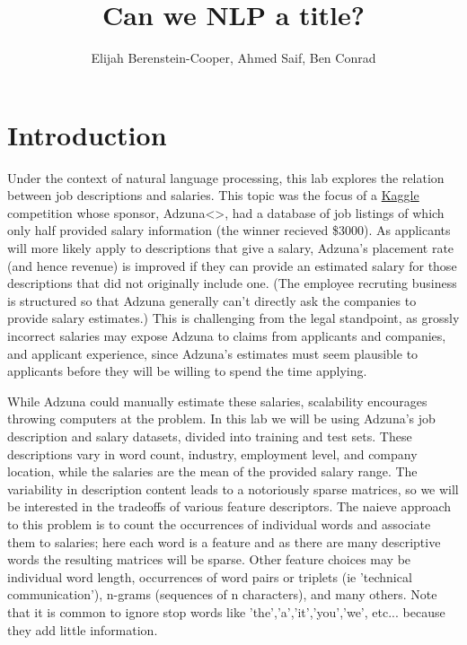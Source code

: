 \documentclass[12pt]{article}
\begin{document}
\title{Can we NLP a title?}

\author{
Elijah Berenstein-Cooper, Ahmed Saif, Ben Conrad
}
\maketitle


\section{Introduction}
Under the context of natural language processing, this lab explores the relation between job descriptions and salaries.
This topic was the focus of a \href{http://www.kaggle.com/c/job-salary-prediction}{Kaggle} competition whose sponsor, Adzuna<>, had a database of job listings of which only half provided salary information (the winner recieved \$3000).
As applicants will more likely apply to descriptions that give a salary, Adzuna's placement rate (and hence revenue) is improved if they can provide an estimated salary for those descriptions that did not originally include one.
(The employee recruting business is structured so that Adzuna generally can't directly ask the companies to provide salary estimates.)
This is challenging from the legal standpoint, as grossly incorrect salaries may expose Adzuna to claims from applicants and companies, and applicant experience, since Adzuna's estimates must seem plausible to applicants before they will be willing to spend the time applying.

While Adzuna could manually estimate these salaries, scalability encourages throwing computers at the problem.
In this lab we will be using Adzuna's job description and salary datasets, divided into training and test sets.
These descriptions vary in word count, industry, employment level, and company location, while the salaries are the mean of the provided salary range.
The variability in description content leads to a notoriously sparse matrices, so we will be interested in the tradeoffs of various feature descriptors.
The naieve approach to this problem is to count the occurrences of individual words and associate them to salaries; here each word is a feature and as there are many descriptive words the resulting matrices will be sparse.
Other feature choices may be individual word length, occurrences of word pairs or triplets (ie 'technical communication'), n-grams (sequences of n characters), and many others.
Note that it is common to ignore stop words like 'the','a','it','you','we', etc... because they add little information.
\end{document}

